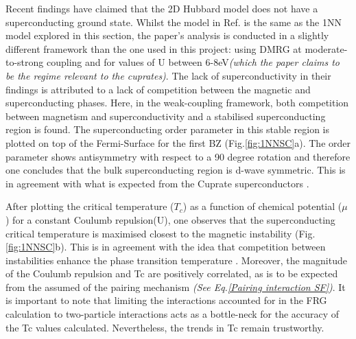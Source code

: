 \documentclass[12pt]{article}
\begin{document}
Recent findings have claimed that the 2D Hubbard model does not have a superconducting ground state\cite{qin2020absence}. 
Whilst the model in Ref. \cite{qin2020absence} is the same as the 1NN model explored in this section, the paper's analysis is conducted in a 
slightly different framework than the one used in this project: using DMRG \cite{white1992density} 
at moderate-to-strong coupling and for values of U between 6-8eV\textit{(which the paper claims to be the 
regime relevant to the cuprates)}.
The lack of superconductivity in their findings is attributed to a lack of competition 
between the magnetic and superconducting phases. Here, in the weak-coupling framework, both  competition between magnetism and superconductivity and 
a stabilised superconducting region is found. The superconducting order parameter in this stable region is plotted on top of the Fermi-Surface for the first BZ (Fig.\ref{fig:1NNSC}a).
The order parameter shows antisymmetry with respect to a 90 degree rotation and therefore one concludes that
the bulk superconducting region is d-wave symmetric. This is in agreement with what is expected from the Cuprate superconductors \cite{tsuei2000pairing}.\par
\medskip
\noindent 
After plotting the critical temperature ($T_c$) as a function of chemical potential ($\mu$) for a constant Coulumb repulsion(U), one observes that
the superconducting critical temperature is maximised closest to the magnetic instability (Fig.\ref{fig:1NNSC}b).
This is in agreement with the idea that competition between instabilities
enhance the phase transition temperature \cite{maple1995interplay,sun2016dome}. Moreover, the magnitude of the Coulumb repulsion and Tc are positively correlated, as is to be expected from the assumed 
of the pairing mechanism \textit{(See Eq.\ref{Pairing interaction SF})}.
It is important to note that limiting the interactions 
accounted for in the FRG calculation to two-particle interactions acts as a bottle-neck for the accuracy 
of the Tc values calculated. Nevertheless, the trends in Tc remain trustworthy. 
\end{document}

